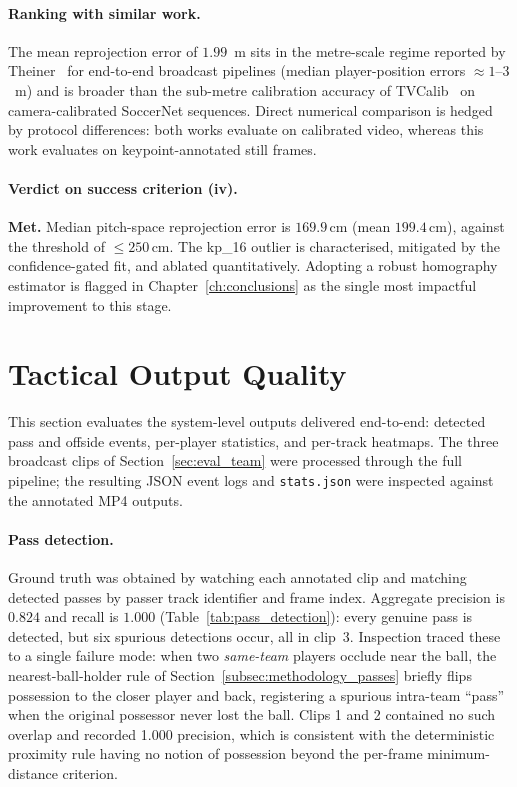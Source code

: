 \paragraph{Ranking with similar work.}
The mean reprojection error of $1.99$~m sits in the metre-scale
regime reported by Theiner~\cite{Theiner2022} for end-to-end
broadcast pipelines (median player-position errors $\approx 1$--$3$~m)
and is broader than the sub-metre calibration accuracy of
TVCalib~\cite{TVCalib2023} on camera-calibrated SoccerNet sequences.
Direct numerical comparison is hedged by protocol differences: both works evaluate on
calibrated video, whereas this work evaluates on keypoint-annotated
still frames.

\paragraph{Verdict on success criterion (iv).}
\textbf{Met.} Median pitch-space reprojection error is $169.9$\,cm
(mean $199.4$\,cm), against the threshold of $\leq 250$\,cm. The
kp\_16 outlier is characterised, mitigated by the confidence-gated
fit, and ablated quantitatively. Adopting a robust homography
estimator is flagged in Chapter~\ref{ch:conclusions} as the single
most impactful improvement to this stage.

\section{Tactical Output Quality}
\label{sec:eval_tactical}

This section evaluates the system-level outputs delivered end-to-end:
detected pass and offside events, per-player statistics, and per-track
heatmaps. The three broadcast clips of Section~\ref{sec:eval_team}
were processed through the full pipeline; the resulting JSON event
logs and \texttt{stats.json} were inspected against the annotated
MP4 outputs.

\paragraph{Pass detection.}
Ground truth was obtained by watching each annotated clip and
matching detected passes by passer track identifier and frame index.
Aggregate precision is $0.824$ and recall is $1.000$
(Table~\ref{tab:pass_detection}): every genuine pass is detected, but
six spurious detections occur, all in clip~3. Inspection traced these
to a single failure mode: when two \emph{same-team} players occlude
near the ball, the nearest-ball-holder rule of
Section~\ref{subsec:methodology_passes} briefly flips possession to
the closer player and back, registering a spurious intra-team
\enquote{pass} when the original possessor never lost the ball.
Clips 1 and 2 contained no such overlap and recorded 1.000 precision, 
which is consistent with the deterministic proximity rule having no 
notion of possession beyond the per-frame minimum-distance criterion.

